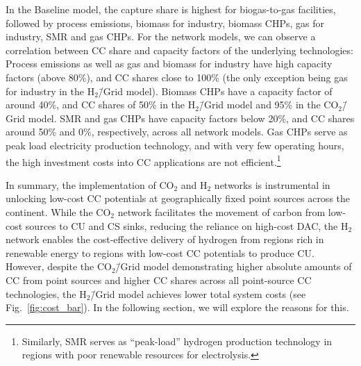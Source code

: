 \documentclass[twocolumn]{article}
\newcommand{\COtwo}{CO$_2$}
\newcommand{\Htwo}{H$_2$}
\newcommand{\modBase}{Baseline model}
\newcommand{\modCO}{CO$_2$\=/Grid model}
\newcommand{\modH}{H$_2$\=/Grid model}
\begin{document}
In the \modBase{}, the capture share is highest for biogas-to-gas facilities, followed by process emissions, biomass for industry, biomass CHPs, gas for industry, SMR and gas CHPs. For the network models, we can observe a correlation between CC share and capacity factors of the underlying technologies: Process emissions as well as gas and biomass for industry have high capacity factors (above 80\%), and CC shares close to 100\% (the only exception being gas for industry in the \modH{}). Biomass CHPs have a capacity factor of around 40\%, and CC shares of 50\% in the \modH{} and 95\% in the \modCO{}. SMR and gas CHPs have capacity factors below 20\%, and CC shares around 50\% and 0\%, respectively, across all network models. Gas CHPs serve as peak load electricity production technology, and with very few operating hours, the high investment costs into CC applications are not efficient.\footnote[1]{Similarly, SMR serves as ``peak-load'' hydrogen production technology in regions with poor renewable resources for electrolysis.}


In summary, the implementation of \COtwo{} and \Htwo{} networks is instrumental in unlocking low-cost CC potentials at geographically fixed point sources across the continent. While the \COtwo{} network facilitates the movement of carbon from low-cost sources to CU and CS sinks, reducing the reliance on high-cost DAC, the \Htwo{} network enables the cost-effective delivery of hydrogen from regions rich in renewable energy to regions with low-cost CC potentials to produce CU. However, despite the \modCO{} demonstrating higher absolute amounts of CC from point sources and higher CC shares across all point-source CC technologies, the \modH{} achieves lower total system costs (see Fig.~\ref{fig:cost_bar}). In the following section, we will explore the reasons for this.


\end{document}
